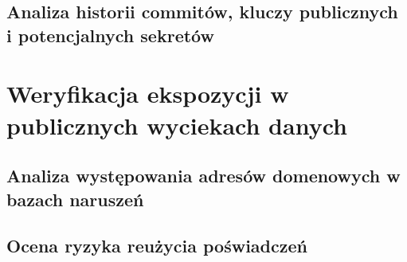 \subsection{Analiza historii commitów, kluczy publicznych i potencjalnych sekretów}\label{subsec:analiza-commitow}

\section{Weryfikacja ekspozycji w publicznych wyciekach danych}\label{sec:wycieki}
\subsection{Analiza występowania adresów domenowych w bazach naruszeń}\label{subsec:bazy-naruszen}
\subsection{Ocena ryzyka reużycia poświadczeń}\label{subsec:ryzyko-poswiadczen}

